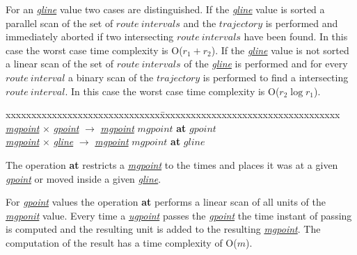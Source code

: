\documentclass[a4paper]{article}
\newcommand{\op}[1]{\textbf{#1}}
\newcommand{\dt}[1]{\textsl{\underline{#1}}}
\begin{document}
For an \dt{gline} value two cases are distinguished. If the \dt{gline} value is
sorted a parallel scan of the set of
$route\ intervals$ and the $trajectory$ is performed and immediately aborted if
two intersecting $route\ intervals$ have been found. In this case the worst case
time complexity is O($r_1 + r_2$). If the \dt{gline} value is not sorted a linear
scan of the set of $route\ intervals$ of the \dt{gline} is performed and for
every $route\ interval$ a binary scan of the $trajectory$ is performed to find
a intersecting $route\ interval$. In this case the worst case time complexity
is O($r_2 \log {r_1}$).
\begin{tabbing}
xxxxxxxxxxxxxxxxxxxxxxxxxxxxxx\=xxxxxxxxxxxxxxxxxxxxxxxxxxxxxxxxxxx\kill
\dt{mgpoint} $\times$ \dt{gpoint} $\rightarrow$ \dt{mgpoint} \> $mgpoint$ \op{at} $gpoint$\\
\dt{mgpoint} $\times$ \dt{gline} $\rightarrow$ \dt{mgpoint} \> $mgpoint$ \op{at} $gline$\\
\end{tabbing}
The operation \op{at} restricts a \dt{mgpoint} to the times and places it was
at a given \dt{gpoint} or moved inside a given \dt{gline}.

For \dt{gpoint} values
the operation \op{at} performs a linear scan of all units of the \dt{mgponit}
value. Every time a \dt{ugpoint} passes the \dt{gpoint} the time instant of
passing is computed and the resulting unit is added to the resulting \dt{mgpoint}.
The computation of the result has a time complexity of O($m$).
\end{document}
